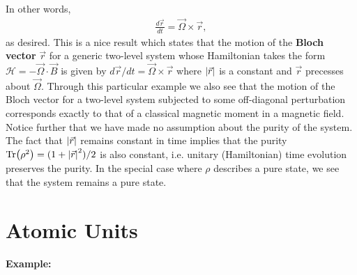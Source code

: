 \documentclass{book}
\theoremstyle{definition}
\newcommand{\ham}{\mathcal{H}}
\newcommand{\f}[2]{\frac{#1}{#2}}
\begin{document}
In other words, 
\begin{align*}
	\f{d\vec{r}}{dt} = \vec{\Omega} \times \vec{r},
\end{align*}
as desired. This is a nice result which states that the motion of the \textbf{Bloch vector} $\vec{r}$ for a generic two-level system whose Hamiltonian takes the form $\ham = - \vec{\Omega} \cdot \vec{B}$ is given by $d\vec{r}/dt = \vec{\Omega}\times \vec{r}$ where $\abs{\vec{r}}$ is a constant and $\vec{r}$ precesses about $\vec{\Omega}$. Through this particular example we also see that the motion of the Bloch vector for a two-level system subjected to some off-diagonal perturbation corresponds exactly to that of a classical magnetic moment in a magnetic field. \\


Notice further that we have made no assumption about the purity of the system. The fact that $\abs{\vec{r}}$ remains constant in time implies that the purity $\Tr(\rho^2) = (1 + \abs{\vec{r}}^2)/2$ is also constant, i.e. unitary (Hamiltonian) time evolution preserves the purity. In the special case where $\rho$ describes a pure state, we see  that the system remains a pure state. 











\section{Atomic Units}




\noindent \textbf{Example:}
\end{document}
